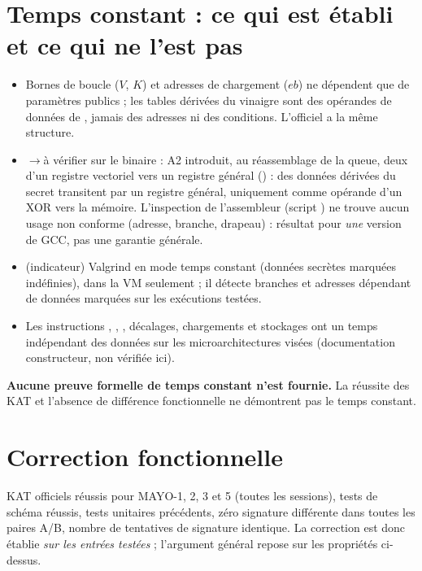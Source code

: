 \section{Temps constant : ce qui est établi et ce qui ne l'est pas}
\begin{itemize}
\item \Pc{} Bornes de boucle ($V$, $K$) et adresses de chargement ($eb$) ne dépendent que de paramètres publics ; les tables dérivées du vinaigre sont des opérandes de données de \vpshufb{}, jamais des adresses ni des conditions. L'officiel a la même structure.
\item \Pc{}$\to$à vérifier sur le binaire : A2 introduit, au réassemblage de la queue, deux  d'un registre vectoriel vers un registre général () : des données dérivées du secret transitent par un registre général, uniquement comme opérande d'un XOR vers la mémoire. L'inspection de l'assembleur (script ) ne trouve aucun usage non conforme (adresse, branche, drapeau) : résultat pour \emph{une} version de GCC, pas une garantie générale.
\item \Pe{} (indicateur) Valgrind en mode temps constant (données secrètes marquées indéfinies), dans la VM seulement ; il détecte branches et adresses dépendant de données marquées sur les exécutions testées.
\item \Hy{} Les instructions \vpshufb{}, , , décalages, chargements et stockages ont un temps indépendant des données sur les microarchitectures visées (documentation constructeur, non vérifiée ici).
\end{itemize}
\textbf{Aucune preuve formelle de temps constant n'est fournie.} La réussite des KAT et l'absence de différence fonctionnelle ne démontrent pas le temps constant.

\section{Correction fonctionnelle}
KAT officiels réussis pour MAYO-1, 2, 3 et 5 (toutes les sessions), tests de schéma réussis, tests unitaires précédents, zéro signature différente dans toutes les paires A/B, nombre de tentatives de signature identique. La correction est donc établie \emph{sur les entrées testées} ; l'argument général repose sur les propriétés \Pc{} ci-dessus.
